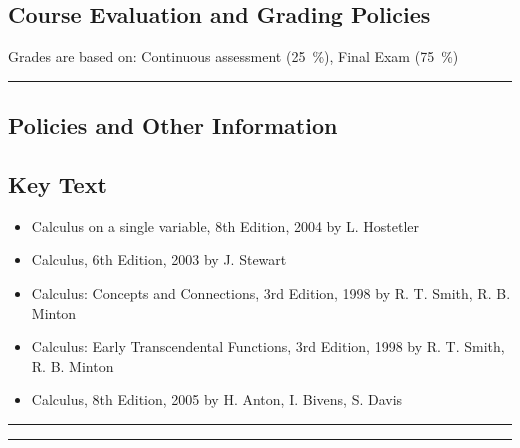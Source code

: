 \subsection*{Course Evaluation and Grading Policies}
Grades are based on:
Continuous assessment (\qty{25}{\percent}),
Final Exam (\qty{75}{\percent})
\vspace{2ex}\hrule\vspace{2ex}



\subsection*{Policies and Other Information}
\subsection*{Key Text}
\begin{itemize}
    \item Calculus on a single variable, 8th Edition, 2004 by  L. Hostetler
    \item Calculus, 6th Edition, 2003 by J. Stewart
    \item Calculus: Concepts and Connections, 3rd Edition, 1998 by R. T. Smith, R. B. Minton
    \item Calculus: Early Transcendental Functions, 3rd Edition, 1998 by R. T. Smith, R. B. Minton
    \item Calculus, 8th Edition, 2005 by H. Anton, I. Bivens, S. Davis
\end{itemize}
\vspace{2ex}\hrule
\vspace{2ex}\hrule\vspace{2ex}